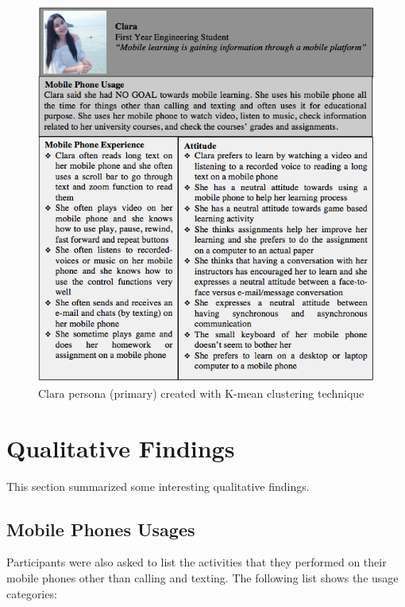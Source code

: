 \newpage
\begin{figure}[!hbt]
\centering
\includegraphics[width=1.0 \textwidth]{clara}
\caption{Clara persona (primary) created with K-mean clustering technique}
\end{figure}


\newpage 
\section{Qualitative Findings}

This section summarized some interesting qualitative findings. 

\subsection{Mobile Phones Usages} 
Participants were also asked to list the activities that they performed on their mobile phones other than calling and texting. The following list shows the usage categories:

